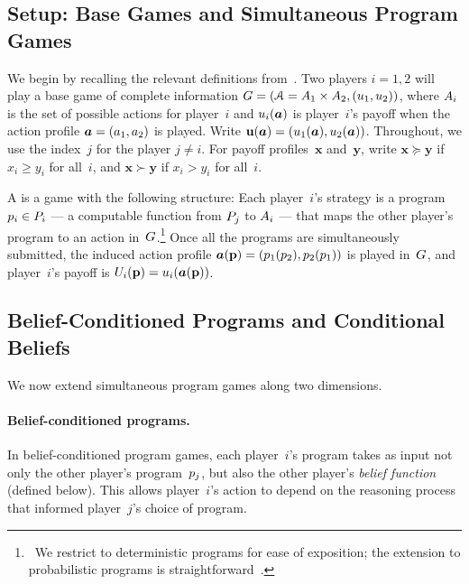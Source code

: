 \documentclass[sigconf]{aamas}
\theoremstyle{definition}
\begin{document}
\subsection{Setup: Base Games and Simultaneous Program Games}\label{sub:basegame}

We begin by recalling the relevant definitions from~\citet{digiovanni2024safe}.
Two players $i=1,2$ will play a base game of complete information $G = (\mathcal{A} = A_1 \times A_2, (u_1, u_2))$,
where $A_i$ is the set of possible actions for player~$i$ and $u_i(\boldsymbol{a})$ is player~$i$'s payoff when the action profile $\boldsymbol{a} = (a_1, a_2)$ is played.
Write $\textbf{u}(\boldsymbol{a}) = (u_1(\boldsymbol{a}), u_2(\boldsymbol{a}))$.
Throughout, we use the index~$j$ for the player $j \neq i$.
For payoff profiles~$\mathbf{x}$ and~$\mathbf{y}$, write $\mathbf{x} \succeq \mathbf{y}$ if $x_i \geq y_i$ for all~$i$, and $\mathbf{x} \succ \mathbf{y}$ if $x_i > y_i$ for all~$i$.

A  is a game with the following structure: Each player~$i$'s strategy is a program $p_i \in P_i$ --- a computable function from $P_j$ to $A_i$ --- that maps the other player's program to an action in~$G$.\footnote{\ We restrict to deterministic programs for ease of exposition; the extension to probabilistic programs is straightforward~\citep{kalai2010commitment}.}
Once all the programs are simultaneously submitted, the induced action profile $\boldsymbol{a}(\textbf{p}) = (p_1(p_2), p_2(p_1))$ is played in~$G$, and player~$i$'s payoff is $U_i(\textbf{p}) = u_i(\boldsymbol{a}(\textbf{p}))$.


\subsection{Belief-Conditioned Programs and Conditional Beliefs}\label{sub:bcprog}

We now extend simultaneous program games along two dimensions.

\paragraph{Belief-conditioned programs.}
In belief-conditioned program games, each player~$i$'s program takes as input not only the other player's program~$p_j$, but also the other player's \textit{belief function} (defined below).
This allows player~$i$'s action to depend on the reasoning process that informed player~$j$'s choice of program. 
\end{document}
